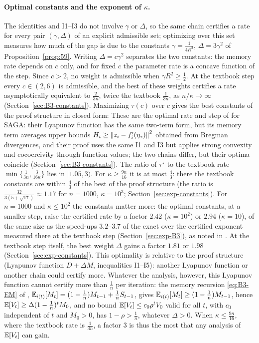 \paragraph{Optimal constants and the exponent of $\kappa$.}
The identities and I1--I3 do not involve $\gamma$ or $\Delta$, so the same chain certifies a rate for every pair
$(\gamma,\Delta)$ of an explicit admissible set; optimizing over this set measures how much of the gap is due to the
constants $\gamma=\frac1{4R^2}$, $\Delta=3\gamma^2$ of Proposition~\ref{prop:59}.
Writing $\Delta=c\gamma^2$ separates the two constants: the memory rate depends on $c$ only, and for fixed $c$ the
parameter rate is a concave function of the step.
Since $c>2$, no weight is admissible when $\gamma R^2\ge\frac12$. At the textbook step every $c\in(2,6)$ is admissible,
and the best of these weights certifies a rate asymptotically equivalent to $\frac2{3n}$, twice the textbook
$\frac1{3n}$, as $n/\kappa\to\infty$ (Section~\ref{sec:B3-constants}). Maximizing $\tau(c)$ over $c$ gives the best
constants of the proof structure in closed form:
These are the optimal rate and step of \cite[Theorem~1 and Corollary~1]{hofmann2015variance} for SAGA: their Lyapunov
function has the same two-term form, but its memory term averages upper bounds $H_i\ge\left\|z_i-f'_i(\eta_\ast)\right\|^2$
obtained from Bregman divergences, and their proof uses the same I1 and I3 but applies strong convexity and
cocoercivity through function values; the two chains differ, but their optima coincide (Section~\ref{sec:B3-constants}).
The ratio of $\tau^\star$ to the textbook rate $\min\{\frac1{3n},\frac3{16\kappa}\}$ lies in $[1.05,3)$. For
$\kappa\ge\frac{9n}{16}$ it is at most $\frac43$: there the textbook constants are within $\frac43$ of the best of the
proof structure (the ratio is $\frac{32}{3(5+\sqrt{17})}\approx1.17$ for $n=1000$, $\kappa=10^3$;
Section~\ref{sec:exp-constants}). For $n=1000$ and $\kappa\le10^2$ the constants matter more: the optimal constants, at a
smaller step, raise the certified rate by a factor $2.42$ ($\kappa=10^2$) or $2.94$ ($\kappa=10$), of the same size as the
speed-ups $3.2$--$3.7$ of the exact over the certified exponent measured there at the textbook step
(Section~\ref{sec:exp-B3}), as noted in . At the textbook step itself, the best weight $\Delta$
gains a factor $1.81$ or $1.98$ (Section~\ref{sec:exp-constants}). This optimality is relative to the proof structure
(Lyapunov function $D+\Delta M$, inequalities I1--I5): another Lyapunov function or another chain could certify more.
Whatever the analysis, however, this Lyapunov function cannot certify more than $\frac1n$ per iteration: the memory
recursion \eqref{eq:B3-EM} of , $\mathbb{E}_{i(t)}[M_t]=(1-\frac1n)M_{t-1}+\frac1nS_{t-1}$, gives
$\mathbb{E}_{i(t)}[M_t]\ge(1-\frac1n)M_{t-1}$, hence $\mathbb{E}[V_t]\ge\Delta(1-\frac1n)^tM_0$, and no bound $\mathbb{E}[V_t]\le c_0\rho^tV_0$ valid for
all $t$, with $c_0$ independent of $t$ and $M_0>0$, has $1-\rho>\frac1n$, whatever $\Delta>0$. When
$\kappa\le\frac{9n}{16}$, where the textbook rate is $\frac1{3n}$, a factor $3$ is thus the most that any analysis of
$\mathbb{E}[V_t]$ can gain.

